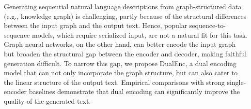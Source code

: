 Generating sequential natural language descriptions from graph-structured data (e.g., knowledge graph) is challenging, partly because of the structural differences between the input graph and the output text. Hence, popular sequence-to-sequence models, which require serialized input, are not a natural fit for this task. Graph neural networks, on the other hand, can better encode the input graph but broaden the structural gap between the encoder and decoder, making faithful generation difficult. To narrow this gap, we propose DualEnc, a dual encoding model that can not only incorporate the graph structure, but can also cater to the linear structure of the output text. Empirical comparisons with strong single-encoder baselines demonstrate that dual encoding can significantly improve the quality of the generated text.
